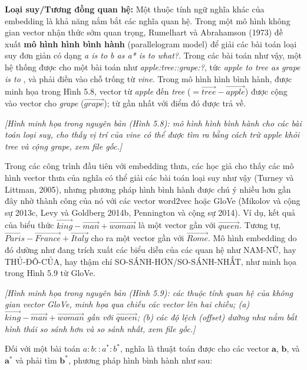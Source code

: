 \textbf{Loại suy/Tương đồng quan hệ:} Một thuộc tính ngữ nghĩa khác của embedding là khả năng nắm bắt các nghĩa quan hệ. Trong một mô hình không gian vector nhận thức sớm quan trọng, Rumelhart và Abrahamson (1973) đề xuất \textbf{mô hình hình bình hành} (parallelogram model) để giải các bài toán loại suy đơn giản có dạng \emph{a is to b as a* is to what?}. Trong các bài toán như vậy, một hệ thống được cho một bài toán như \emph{apple:tree::grape:?}, tức \emph{apple to tree as grape is to} \underline{\hspace{1cm}}, và phải điền vào chỗ trống từ \emph{vine}. Trong mô hình hình bình hành, được minh họa trong Hình 5.8, vector từ \emph{apple} đến \emph{tree} ($= \overrightarrow{tree} - \overrightarrow{apple}$) được cộng vào vector cho \emph{grape} ($\overrightarrow{grape}$); từ gần nhất với điểm đó được trả về.

\textit{[Hình minh họa trong nguyên bản (Hình 5.8): mô hình hình bình hành cho các bài toán loại suy, cho thấy vị trí của \emph{vine} có thể được tìm ra bằng cách trừ \emph{apple} khỏi \emph{tree} và cộng \emph{grape}, xem file gốc.]}

Trong các công trình đầu tiên với embedding thưa, các học giả cho thấy các mô hình vector thưa của nghĩa có thể giải các bài toán loại suy như vậy (Turney và Littman, 2005), nhưng phương pháp hình bình hành được chú ý nhiều hơn gần đây nhờ thành công của nó với các vector word2vec hoặc GloVe (Mikolov và cộng sự 2013c, Levy và Goldberg 2014b, Pennington và cộng sự 2014). Ví dụ, kết quả của biểu thức $\overrightarrow{king} - \overrightarrow{man} + \overrightarrow{woman}$ là một vector gần với $\overrightarrow{queen}$. Tương tự, $\overrightarrow{Paris} - \overrightarrow{France} + \overrightarrow{Italy}$ cho ra một vector gần với $\overrightarrow{Rome}$. Mô hình embedding do đó dường như đang trích xuất các biểu diễn của các quan hệ như NAM-NỮ, hay THỦ-ĐÔ-CỦA, hay thậm chí SO-SÁNH-HƠN/SO-SÁNH-NHẤT, như minh họa trong Hình 5.9 từ GloVe.

\textit{[Hình minh họa trong nguyên bản (Hình 5.9): các thuộc tính quan hệ của không gian vector GloVe, minh họa qua chiếu các vector lên hai chiều; (a) $\overrightarrow{king}-\overrightarrow{man}+\overrightarrow{woman}$ gần với $\overrightarrow{queen}$; (b) các độ lệch (offset) dường như nắm bắt hình thái so sánh hơn và so sánh nhất, xem file gốc.]}

Đối với một bài toán $a:b::a^*:b^*$, nghĩa là thuật toán được cho các vector $\mathbf{a}$, $\mathbf{b}$, và $\mathbf{a^*}$ và phải tìm $\mathbf{b^*}$, phương pháp hình bình hành như sau:

